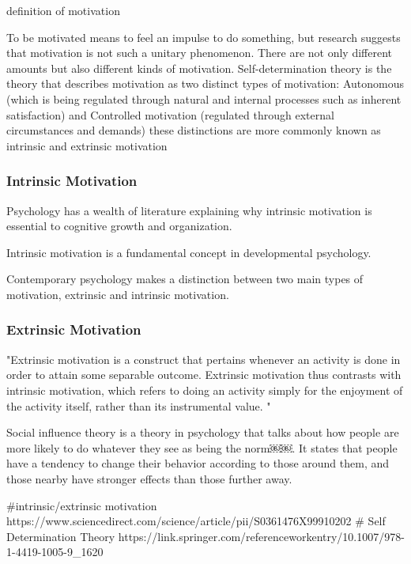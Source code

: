 
\todo definition of motivation


To be motivated means to feel an impulse to do something, but research suggests that motivation is not such a unitary phenomenon. There are not only different amounts but also different kinds of motivation. \cite{Ryan2000Jan}
Self-determination theory is the theory that describes motivation as two distinct types of motivation: Autonomous (which is being regulated through natural and internal processes such as inherent satisfaction) and Controlled motivation (regulated through external circumstances and demands) \cite{Lawman2013} these distinctions are more commonly known as intrinsic and extrinsic motivation \cite{Legault2016Nov}

\subsubsection{Intrinsic Motivation}
Psychology has a wealth of literature explaining why intrinsic motivation is essential to cognitive growth and organization.

Intrinsic motivation is a fundamental concept in developmental psychology.

Contemporary psychology makes a distinction between two main types of motivation, extrinsic and intrinsic motivation.

\subsubsection{Extrinsic Motivation}
"Extrinsic motivation is a construct that pertains whenever an activity is done in order to attain some separable outcome. Extrinsic motivation thus contrasts with intrinsic motivation, which refers to doing an activity simply for the enjoyment of the activity itself, rather than its instrumental value. "
\cite{Ryan2000Jan}


Social influence theory is a theory in psychology that talks about how people are more likely to do whatever they see as being the norm￼￼. It states that people have a tendency to change their behavior according to those around them, and those nearby have stronger effects than those further away.


#intrinsic/extrinsic motivation https://www.sciencedirect.com/science/article/pii/S0361476X99910202
# Self Determination Theory
https://link.springer.com/referenceworkentry/10.1007/978-1-4419-1005-9_1620